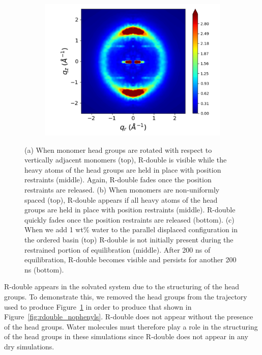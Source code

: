 \documentclass[journal=jpcbfk,manuscript=article]{achemso}
\begin{document}
\begin{figure}[!htb]
\begin{subfigure}{0.3\linewidth}
  	\centering
  	\includegraphics[width=\textwidth]{solvated_offset_rzplot_1.pdf}
  	\caption{}\label{fig:solvated_pore_rzplot_norestraints}
  \end{subfigure}
  \caption{(a) When monomer head groups are rotated with respect to vertically
	  adjacent monomers (top), R-double is visible while the heavy atoms of the head
	  groups are held in place with position restraints (middle). Again, R-double
	  fades once the position restraints are released. (b) When monomers are
	  non-uniformly spaced (top), R-double appears if all heavy atoms of the head
	  groups are held in place with position restraints (middle). R-double quickly
	  fades once the position restraints are released (bottom). (c) When we add 1
	  wt\% water to the parallel displaced configuration in the ordered basin (top)
	  R-double is not initially present during the restrained portion of
	  equilibration (middle).  After 200 ns of equilibration, R-double becomes
	  visible and persists for another 200 ns (bottom).}\label{fig:rdouble}
  \end{figure}

  R-double appears in the solvated system due to the structuring of the head
  groups. To demonstrate this, we removed the head groups from the trajectory
  used to produce Figure~\ref{fig:solvated_pore_rzplot_norestraints} in order to
  produce that shown in Figure~\ref{fig:rdouble_nophenyls}. R-double does not
  appear without the presence of the head groups. Water molecules must therefore play a
  role in the structuring of the head groups in these simulations since R-double does not appear in
  any dry simulations.
\end{document}
